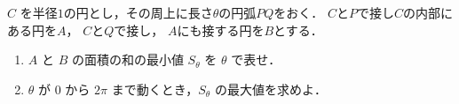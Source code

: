 \documentclass[../../main.tex]{subfiles}
\begin{document}
$C$ を半径$1$の円とし，その周上に長さ$\theta$の円弧$PQ$をおく．
$C$と$P$で接し$C$の内部にある円を$A$， $C$と$Q$で接し， $A$にも接する円を$B$とする．
\begin{enumerate}
  \item $A$ と $B$ の面積の和の最小値 $S_\theta$ を $\theta$ で表せ．
  \item $\theta$ が $0$ から $2\pi$ まで動くとき，$S_\theta$ の最大値を求めよ．
\end{enumerate}
\end{document}
